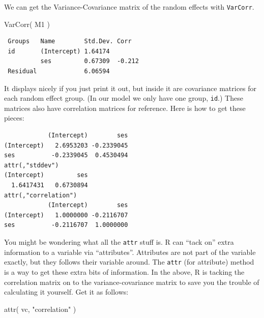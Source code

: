 \documentclass[
  letterpaper,
  DIV=11,
  numbers=noendperiod]{scrreprt}
\newenvironment{Shaded}{\begin{snugshade}}{\end{snugshade}}
\newcommand{\FunctionTok}[1]{\textcolor[rgb]{0.02,0.16,0.49}{#1}}
\newcommand{\NormalTok}[1]{\textcolor[rgb]{0.00,0.44,0.13}{#1}}
\newcommand{\OtherTok}[1]{\textcolor[rgb]{0.00,0.44,0.13}{#1}}
\newcommand{\SpecialCharTok}[1]{\textcolor[rgb]{0.25,0.44,0.63}{#1}}
\newcommand{\StringTok}[1]{\textcolor[rgb]{0.25,0.44,0.63}{#1}}
\begin{document}
We can get the Variance-Covariance matrix of the random effects with
\texttt{VarCorr}.

\begin{Shaded}
\begin{Highlighting}[]
\FunctionTok{VarCorr}\NormalTok{( M1 )}
\end{Highlighting}
\end{Shaded}

\begin{verbatim}
 Groups   Name        Std.Dev. Corr  
 id       (Intercept) 1.64174        
          ses         0.67309  -0.212
 Residual             6.06594        
\end{verbatim}

It displays nicely if you just print it out, but inside it are
covariance matrices for each random effect group. (In our model we only
have one group, \texttt{id}.) These matrices also have correlation
matrices for reference. Here is how to get these pieces:

\begin{Shaded}
\end{Shaded}

\begin{verbatim}
            (Intercept)        ses
(Intercept)   2.6953203 -0.2339045
ses          -0.2339045  0.4530494
attr(,"stddev")
(Intercept)         ses 
  1.6417431   0.6730894 
attr(,"correlation")
            (Intercept)        ses
(Intercept)   1.0000000 -0.2116707
ses          -0.2116707  1.0000000
\end{verbatim}

You might be wondering what all the \texttt{attr} stuff is. R can ``tack
on'' extra information to a variable via ``attributes''. Attributes are
not part of the variable exactly, but they follows their variable
around. The \texttt{attr} (for attribute) method is a way to get these
extra bits of information. In the above, R is tacking the correlation
matrix on to the variance-covariance matrix to save you the trouble of
calculating it yourself. Get it as follows:

\begin{Shaded}
\begin{Highlighting}[]
\FunctionTok{attr}\NormalTok{( vc, }\StringTok{"correlation"}\NormalTok{ )}
\end{Highlighting}
\end{Shaded}
\end{document}
